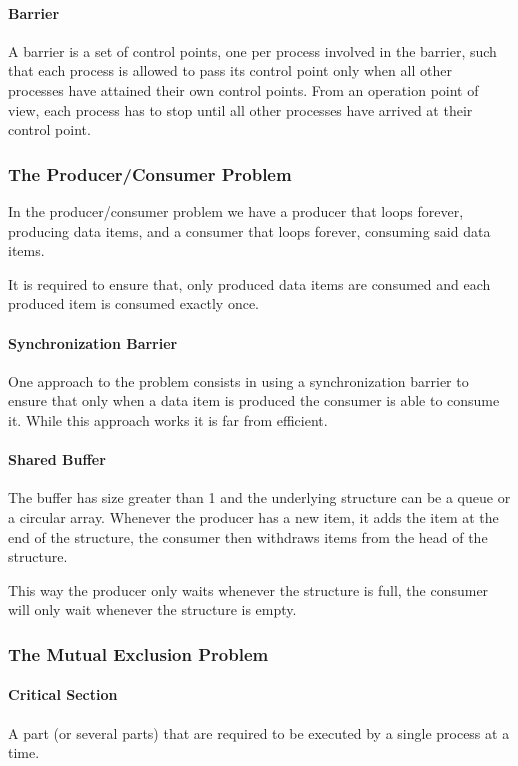\paragraph{Barrier}
A barrier is a set of control points, one per process involved in the barrier,
such that each process is allowed to pass its control point only when all other processes have attained their own control points.
From an operation point of view, each process has to stop until all other processes have arrived at their control point.

\subsubsection{The Producer/Consumer Problem}

In the producer/consumer problem we have a producer that loops forever, producing data items,
and a consumer that loops forever, consuming said data items.

It is required to ensure that,
only produced data items are consumed and each produced item is consumed exactly once.

\paragraph{Synchronization Barrier}
One approach to the problem consists in using a synchronization barrier to ensure that only when a data item is produced the consumer is able to consume it.
While this approach works it is far from efficient.

\paragraph{Shared Buffer}
The buffer has size greater than 1 and the underlying structure can be a queue or a circular array.
Whenever the producer has a new item, it adds the item at the end of the structure,
the consumer then withdraws items from the head of the structure.

This way the producer only waits whenever the structure is full,
the consumer will only wait whenever the structure is empty.

\subsubsection{The Mutual Exclusion Problem}

\paragraph{Critical Section}
A part (or several parts) that are required to be executed by a single process at a time.

